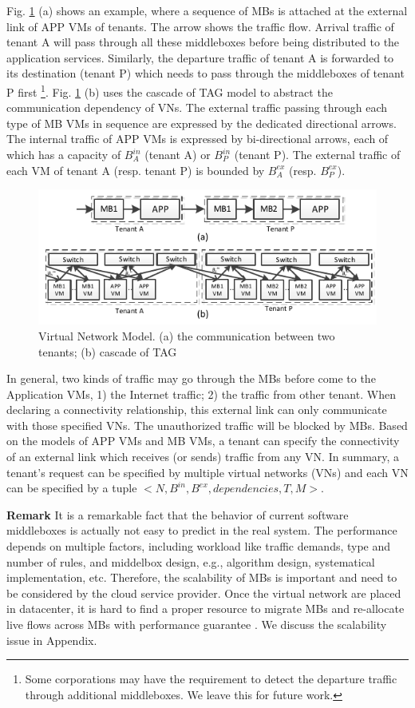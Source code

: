 \documentclass[10pt, conference, letterpaper]{IEEEtran}
\begin{document}
Fig. \ref{fig:abstraction} (a) shows an example, where a sequence of MBs is attached at the external link of APP VMs of tenants. The arrow shows the traffic flow. Arrival traffic of tenant A will pass through all these middleboxes before being distributed to the application services. Similarly,  the departure traffic of tenant A is forwarded to its destination (tenant P) which needs to pass through the middleboxes of tenant P first \footnote{Some corporations may have the requirement to detect the departure traffic through additional middleboxes. We leave this for future work. }.  Fig. \ref{fig:abstraction} (b) uses the cascade of TAG model to abstract the communication dependency of VNs. The external traffic passing through each type of MB VMs in sequence are expressed by the dedicated directional arrows. The internal traffic of APP VMs is expressed by bi-directional arrows, each of which has a capacity of $B_{A}^{in}$ (tenant A) or $B_{P}^{in}$ (tenant P). The external traffic of each VM of tenant A (resp. tenant P) is bounded by $B_{A}^{ex}$ (resp. $B_{P}^{ex}$). 
\begin{figure}
	\centering
		\includegraphics[width=3.5 in]{fig/abstraction.pdf}
	\caption{Virtual Network Model. (a) the communication between two tenants; (b) cascade of TAG}
	\label{fig:abstraction}
\end{figure}

In general, two kinds of traffic may go through the MBs before come to the Application VMs, 1) the Internet traffic; 2) the traffic from other tenant. When declaring a connectivity relationship, this external link can only communicate with those specified VNs. The unauthorized traffic will be blocked by MBs. Based on the models of APP VMs and MB VMs, a tenant can specify the connectivity of an external link which receives (or sends) traffic from any VN. In summary, a tenant's request can be specified by multiple virtual networks (VNs) and each VN can be specified by a tuple $<N, B^{in}, B^{ex}, dependencies, T, M>$. 

\noindent \textbf{Remark } 
It is a remarkable fact that the behavior of current software middleboxes is actually not easy to predict in the real system. The performance depends on multiple factors, including workload like traffic demands, type and number of rules, and middelbox design, e.g., algorithm design, systematical implementation, etc. Therefore, the scalability of MBs is important and need to be considered by the cloud service provider. Once the virtual network are placed in datacenter, it is hard to find a proper resource to migrate MBs and re-allocate live flows across MBs with performance guarantee \cite{G13dio}. We discuss the scalability issue in Appendix.
\end{document}

